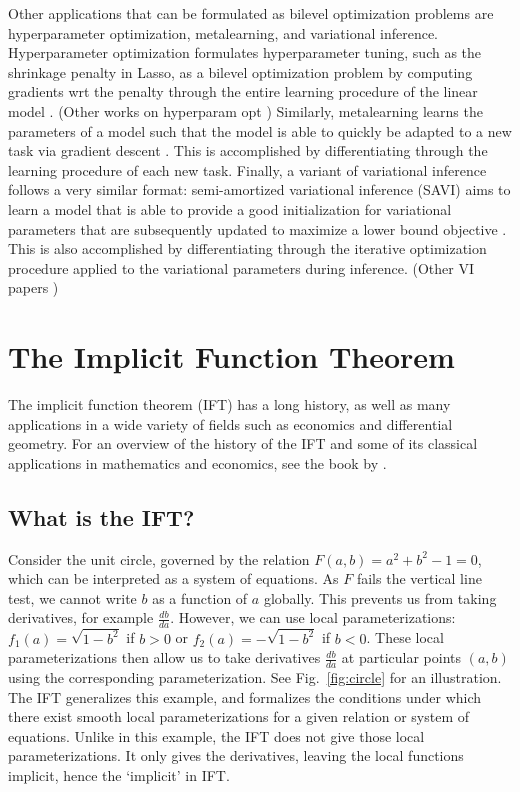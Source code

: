 \documentclass[11pt]{article}
\begin{document}
Other applications that can be formulated as bilevel optimization problems are
hyperparameter optimization, metalearning, and variational inference.
Hyperparameter optimization formulates hyperparameter tuning, such as the shrinkage penalty in Lasso,
as a bilevel optimization problem by computing gradients wrt the penalty through the entire learning procedure
of the linear model \citep{lorraine2019implasso}.
(Other works on hyperparam opt \citep{maclaurin2015reversible,bertrand2020implicit})
Similarly, metalearning learns the parameters of a model such that the model is able to quickly
be adapted to a new task via gradient descent \citep{finn2017maml,rajeswaran2019imaml}.
This is accomplished by differentiating through the learning procedure of each new task.
Finally, a variant of variational inference follows a very similar format:
semi-amortized variational inference (SAVI) aims to learn a model that is able to provide
a good initialization for variational parameters that are subsequently updated
to maximize a lower bound objective \citep{kim2018savi}.
This is also accomplished by differentiating through the iterative optimization procedure
applied to the variational parameters during inference.
(Other VI papers \citep{vi,johnson2017pgm})

\section{The Implicit Function Theorem}
The implicit function theorem (IFT) has a long history, as well as many applications
in a wide variety of fields such as economics and differential geometry.
For an overview of the history of the IFT and some of its classical applications
in mathematics and economics,
see the book by \citet{iftbook}.

\subsection{What is the IFT?}
Consider the unit circle,
governed by the relation $F(a,b) = a^2 + b^2 - 1 = 0$,
which can be interpreted as a system of equations.
As $F$ fails the vertical line test, we cannot write $b$ as a function of $a$ globally.
This prevents us from taking derivatives, for example $\frac{db}{da}$.
However, we can use local parameterizations: $f_1(a) = \sqrt{1-b^2}$ if $b > 0$
or $f_2(a) = -\sqrt{1-b^2}$ if $b<0$.
These local parameterizations then allow us to take derivatives $\frac{db}{da}$
at particular points $(a,b)$ using the corresponding parameterization.
See Fig.~\ref{fig:circle} for an illustration.
The IFT generalizes this example, and formalizes the conditions under which there exist
smooth local parameterizations for a given relation or system of equations.
Unlike in this example, the IFT does not give those local parameterizations.
It only gives the derivatives, leaving the local functions implicit,
hence the `implicit' in IFT.
\end{document}
